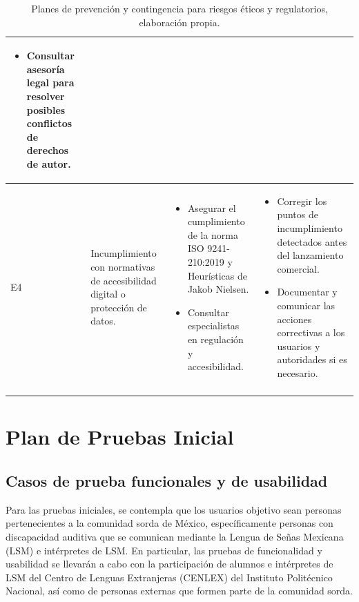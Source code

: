 \begin{longtable}{|>{\centering\arraybackslash}p{0.8cm}|>{\raggedright\arraybackslash}p{3.5cm}|>{\raggedright\arraybackslash}p{5.1cm}|>{\raggedright\arraybackslash}p{5.1cm}|}
\begin{itemize}
		\item Consultar asesoría legal para resolver posibles conflictos de derechos de autor.
	\end{itemize} \\
	\hline
	E4 & Incumplimiento con normativas de accesibilidad digital o protección de datos. &
	\begin{itemize}
		\item Asegurar el cumplimiento de la norma ISO 9241-210:2019 y Heurísticas de Jakob Nielsen.
		\item Consultar especialistas en regulación y accesibilidad.
	\end{itemize} &
	\begin{itemize}
		\item Corregir los puntos de incumplimiento detectados antes del lanzamiento comercial.
		\item Documentar y comunicar las acciones correctivas a los usuarios y autoridades si es necesario.
	\end{itemize} \\
	\hline
\caption[Planes de prevención y contingencia para riesgos éticos y regulatorios]{Planes de prevención y contingencia para riesgos éticos y regulatorios, elaboración propia.} 	\label{tab:riesgos_eticos} \\
\end{longtable}

\section{Plan de Pruebas Inicial}
\subsection{Casos de prueba funcionales y de usabilidad}
Para las pruebas iniciales, se contempla que los usuarios objetivo sean personas pertenecientes a la comunidad sorda de México, específicamente personas con discapacidad auditiva que se comunican mediante la Lengua de Señas Mexicana (LSM) e intérpretes de LSM. En particular, las pruebas de funcionalidad y usabilidad se llevarán a cabo con la participación de alumnos e intérpretes de LSM del Centro de Lenguas Extranjeras (CENLEX) del Instituto Politécnico Nacional, así como de personas externas que formen parte de la comunidad sorda.

